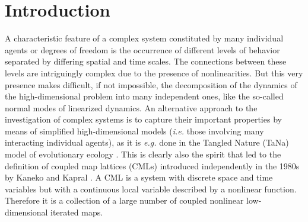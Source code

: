 \documentclass[12pt]{article}
\begin{document}



 
 

\section{Introduction} 
A characteristic feature of a complex system constituted by many individual agents or degrees of freedom is the occurrence of different levels of behavior separated by differing spatial and time scales. The connections between these levels are intriguingly complex due to the presence of nonlinearities. But this very presence makes difficult, if not impossible, the decomposition of the dynamics of the high-dimensional problem into many independent ones, like the so-called normal modes of linearized dynamics. An alternative approach to the investigation of complex systems is to capture their important properties by means of simplified high-dimensional models (\textit{i.e.} those involving many interacting individual agents), as it is \textit{e.g.} done in the Tangled Nature (TaNa) model of evolutionary ecology \cite{tana:article1}. This is clearly also the spirit that led to the definition of coupled map lattices (CMLs) introduced independently in the 1980s by Kaneko \cite{Kaneko_1984} and Kapral \cite{Kapral_1986}. A CML is a system with discrete space and time variables but with a continuous local variable described by a nonlinear function. Therefore it is a collection of a large number of coupled nonlinear low-dimensional iterated maps.
\end{document}
